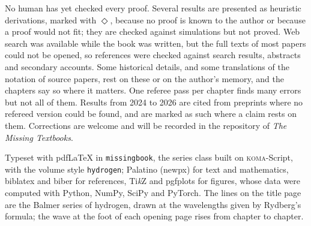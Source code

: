 
No human has yet checked every proof. Several results are presented as heuristic derivations, marked with $\Diamond$, because no proof is known to the author or because a proof would not fit; they are checked against simulations but not proved. Web search was available while the book was written, but the full texts of most papers could not be opened, so references were checked against search results, abstracts and secondary accounts. Some historical details, and some translations of the notation of source papers, rest on these or on the author's memory, and the chapters say so where it matters. One referee pass per chapter finds many errors but not all of them. Results from 2024 to 2026 are cited from preprints where no refereed version could be found, and are marked as such where a claim rests on them. Corrections are welcome and will be recorded in the repository of \emph{The Missing Textbooks}.

\medskip
{\small\noindent Typeset with pdf\LaTeX{} in \texttt{missingbook}, the series class built on \textsc{koma}-Script, with the volume style \texttt{hydrogen}; Palatino (newpx) for text and mathematics, biblatex and biber for references, Ti\emph{k}Z and pgfplots for figures, whose data were computed with Python, NumPy, SciPy and PyTorch. The lines on the title page are the Balmer series of hydrogen, drawn at the wavelengths given by Rydberg's formula; the wave at the foot of each opening page rises from chapter to chapter.\par}
